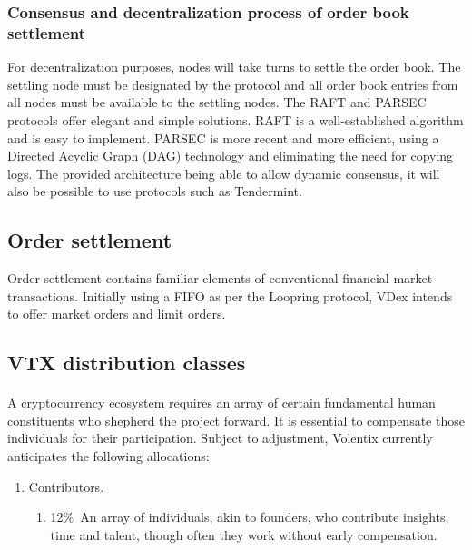 \documentclass[]{article}
\begin{document}
{\subsubsection{Consensus and decentralization process of order book settlement}
For decentralization purposes, nodes will take turns to settle the order book. 
The settling node must be designated by the protocol and all order book entries from all nodes must be available to the settling nodes. 
The RAFT\cite{18} and PARSEC\cite{23} protocols offer elegant and simple solutions. 
RAFT is a well-established algorithm and is easy to implement. PARSEC is more recent and more efficient, using a Directed Acyclic Graph (DAG) technology and eliminating the need for copying logs.
The provided architecture being able to allow dynamic consensus, it will also be possible to use protocols such as Tendermint.

\subsection{Order settlement}
Order settlement contains familiar elements of conventional financial market transactions. Initially using a FIFO as per the Loopring protocol, VDex intends to offer market orders and limit orders. 

\subsection{VTX distribution classes}

\paragraph {}
A cryptocurrency ecosystem requires an array of certain fundamental human constituents who shepherd the project forward. \cite{27}   It is essential to compensate those individuals for their participation. Subject to adjustment, Volentix currently anticipates the following allocations:  
\begin{enumerate}
	\item Contributors. 
	\begin{enumerate}
		\item  12\%\ An array of individuals, akin to founders, who contribute insights, time and talent, though often they work without early compensation. 
	\end{enumerate}
	

\end{enumerate}}
\end{document}
